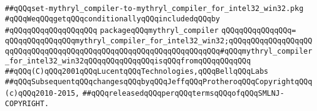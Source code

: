 \label{src/lib/core/compiler/set-mythryl_compiler-to-mythryl_compiler_for_intel32_win32.pkg}
\verb|##qQQqset-mythryl_compiler-to-mythryl_compiler_for_intel32_win32.pkg|\newline
\newline
\verb|#qQQqWeqQQqgetqQQqconditionallyqQQqincludedqQQqby|\newline
\verb|#qQQqqQQqqQQqqQQqqQQq|\newline
\newline
\verb|packageqQQqmythryl_compiler|\newline
\verb|qQQqqQQqqQQqqQQq=|\newline
\verb|qQQqqQQqqQQqqQQqmythryl_compiler_for_intel32_win32;qQQqqQQqqQQqqQQqqQQqqQQqqQQqqQQqqQQqqQQqqQQqqQQqqQQqqQQqqQQqqQQqqQQq#qQQqmythryl_compiler_for_intel32_win32qQQqqQQqqQQqqQQqisqQQqfromqQQqqQQqqQQq|\newline
\newline
\newline
\verb|##qQQq(C)qQQq2001qQQqLucentqQQqTechnologies,qQQqBellqQQqLabs|\newline
\verb|##qQQqSubsequentqQQqchangesqQQqbyqQQqJeffqQQqProtheroqQQqCopyrightqQQq(c)qQQq2010-2015,|\newline
\verb|##qQQqreleasedqQQqperqQQqtermsqQQqofqQQqSMLNJ-COPYRIGHT.|\newline

